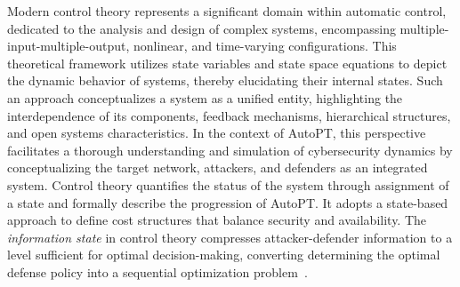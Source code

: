 

Modern control theory represents a significant domain within automatic control, dedicated to the analysis and design of complex systems, encompassing multiple-input-multiple-output, nonlinear, and time-varying configurations. This theoretical framework utilizes state variables and state space equations to depict the dynamic behavior of systems, thereby elucidating their internal states. Such an approach conceptualizes a system as a unified entity, highlighting the interdependence of its components, feedback mechanisms, hierarchical structures, and open systems characteristics. In the context of AutoPT, this perspective facilitates a thorough understanding and simulation of cybersecurity dynamics by conceptualizing the target network, attackers, and defenders as an integrated system. Control theory quantifies the status of the system through assignment of a state and formally describe the progression of AutoPT. It adopts a state-based approach to define cost structures that balance security and availability. The \textit{information state} in control theory compresses attacker-defender information to a level sufficient for optimal decision-making, converting determining the optimal defense policy into a sequential optimization problem~\cite{ErikMiehling2019Control}.


